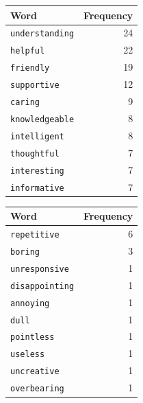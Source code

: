 \begin{table}[!htpb]
\centering
    \begin{tabular}{lr}
        \toprule
        \textbf{Word} & \textbf{Frequency} \\
        \midrule
        \texttt{understanding} & 24 \\
        \texttt{helpful} & 22 \\
        \texttt{friendly} & 19 \\
        \texttt{supportive} & 12 \\
        \texttt{caring} & 9 \\
        \texttt{knowledgeable} & 8 \\
        \texttt{intelligent} & 8 \\
        \texttt{thoughtful} & 7 \\
        \texttt{interesting} & 7 \\
        \texttt{informative} & 7 \\
        \bottomrule
        
    \end{tabular}
    \label{tab:top10pos}
    
\end{table}

\vspace{1em}

\begin{table}[!htpb]
\centering
    \begin{tabular}{lr}
        \toprule
        \textbf{Word} & \textbf{Frequency} \\
        \midrule
        \texttt{repetitive} & 6 \\
        \texttt{boring} & 3 \\
        \texttt{unresponsive} & 1 \\
        \texttt{disappointing} & 1 \\
        \texttt{annoying} & 1 \\
        \texttt{dull} & 1 \\
        \texttt{pointless} & 1 \\
        \texttt{useless} & 1 \\
        \texttt{uncreative} & 1 \\
        \texttt{overbearing} & 1 \\
        \bottomrule
    \end{tabular}
    \label{tab:top10neg}
    
\end{table}



